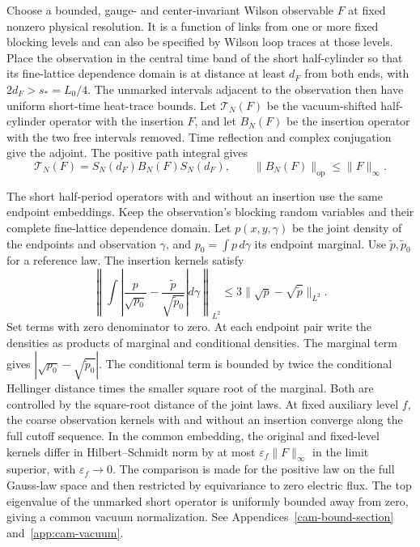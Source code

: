 \documentclass[11pt,a4paper]{article}
\numberwithin{equation}{section}
\newcommand{\op}{\mathrm{op}}
\begin{document}
Choose a bounded, gauge- and center-invariant Wilson observable \(F\) at fixed nonzero physical resolution. It is a function of links from one or more fixed blocking levels and can also be specified by Wilson loop traces at those levels. Place the observation in the central time band of the short half-cylinder so that its fine-lattice dependence domain is at distance at least \(d_F\) from both ends, with \(2d_F>s_*=L_0/4\). The unmarked intervals adjacent to the observation then have uniform short-time heat-trace bounds. Let \(\mathcal T_N(F)\) be the vacuum-shifted half-cylinder operator with the insertion \(F\), and let \(B_N(F)\) be the insertion operator with the two free intervals removed. Time reflection and complex conjugation give the adjoint. The positive path integral gives
\begin{equation}\label{eq:rep-buffer}
 \mathcal T_N(F)=S_N(d_F)B_N(F)S_N(d_F),
 \qquad \|B_N(F)\|_{\op}\leq\|F\|_\infty .
\end{equation}

The short half-period operators with and without an insertion use the same endpoint embeddings. Keep the observation's blocking random variables and their complete fine-lattice dependence domain. Let \(p(x,y,\gamma)\) be the joint density of the endpoints and observation \(\gamma\), and \(p_0=\int p\,d\gamma\) its endpoint marginal. Use \(\widetilde p,\widetilde p_0\) for a reference law. The insertion kernels satisfy
\begin{equation}\label{eq:rep-mark-inequality}
 \left\|\int \left|\frac{p}{\sqrt{p_0}}-\frac{\widetilde p}{\sqrt{\widetilde p_0}}\right|d\gamma\right\|_{L^2}
    \leq 3\|\sqrt p-\sqrt{\widetilde p}\|_{L^2}.
\end{equation}
Set terms with zero denominator to zero. At each endpoint pair write the densities as products of marginal and conditional densities. The marginal term gives \(|\sqrt{p_0}-\sqrt{\widetilde p_0}|\). The conditional term is bounded by twice the conditional Hellinger distance times the smaller square root of the marginal. Both are controlled by the square-root distance of the joint laws. At fixed auxiliary level \(f\), the coarse observation kernels with and without an insertion converge along the full cutoff sequence. In the common embedding, the original and fixed-level kernels differ in Hilbert--Schmidt norm by at most \(\varepsilon_f\|F\|_\infty\) in the limit superior, with \(\varepsilon_f\to0\). The comparison is made for the positive law on the full Gauss-law space and then restricted by equivariance to zero electric flux. The top eigenvalue of the unmarked short operator is uniformly bounded away from zero, giving a common vacuum normalization. See Appendices~\ref{cam-bound-section} and~\ref{app:cam-vacuum}.
\end{document}
